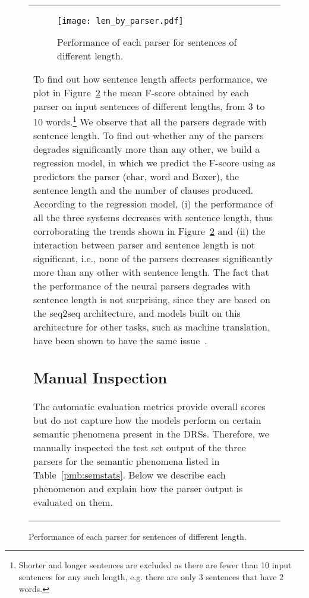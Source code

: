 \documentclass[11pt,a4paper]{article}
\begin{document}
\begin{figure*}[!t]
\begin{subfigure}{50mm}
{{\begin{tabular}[t]{@{}l@{}}
{\begin{figure}[!t]
\hspace*{-2.2mm}
  \texttt{[image: len\_by\_parser.pdf]}
  \caption{\label{fig:senlen}Performance of each parser for sentences of different length.}
\end{figure}

To find out how sentence length affects performance, we plot in Figure~\ref{fig:senlen} the mean F-score obtained by each parser on input sentences of different lengths, from 3 to 10 words.\footnote{Shorter and longer sentences are excluded as there are fewer than 10 input sentences for any such length, e.g. there are only 3 sentences that have 2 words.}
We observe that all the parsers degrade with sentence length.
To find out whether any of the parsers degrades significantly more than any other, 
we build a regression model, in which we predict the F-score 
using as predictors the parser (char, word and Boxer), the sentence length and the number of clauses produced. According to the regression model, (i) the performance of all the three systems decreases with sentence length, thus corroborating the trends shown in Figure~\ref{fig:senlen} and (ii) the interaction between parser and sentence length is not significant, i.e., none of the parsers decreases significantly more than any other with sentence length. 
The fact that the performance of the neural parsers degrades with sentence length is not surprising, since they are based on the seq2seq architecture, and models built on this architecture for other tasks, such as machine translation, have been shown to have the same issue~\cite{toral-sanchezcartagena:2017:EACLlong}.



\subsection{Manual Inspection}

\label{sec:manual}

The automatic evaluation metrics provide overall scores but do not capture how the models perform on certain semantic phenomena present in the DRSs. Therefore, we manually inspected the test set output of the three parsers for the semantic phenomena listed in Table~\ref{pmb:semstats}. 
Below we describe each phenomenon and explain how the parser output is evaluated on them.


}
\end{tabular}}}
\end{subfigure}
\end{figure*}
\end{document}
